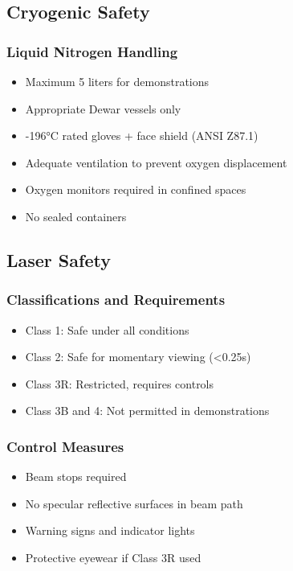 \subsection{Cryogenic Safety}

\subsubsection{Liquid Nitrogen Handling}
\begin{itemize}[noitemsep]
    \item Maximum 5 liters for demonstrations
    \item Appropriate Dewar vessels only
    \item -196°C rated gloves + face shield (ANSI Z87.1)
    \item Adequate ventilation to prevent oxygen displacement
    \item Oxygen monitors required in confined spaces
    \item No sealed containers
\end{itemize}

\subsection{Laser Safety}

\subsubsection{Classifications and Requirements}
\begin{itemize}[noitemsep]
    \item Class 1: Safe under all conditions
    \item Class 2: Safe for momentary viewing (<0.25s)
    \item Class 3R: Restricted, requires controls
    \item Class 3B and 4: Not permitted in demonstrations
\end{itemize}

\subsubsection{Control Measures}
\begin{itemize}[noitemsep]
    \item Beam stops required
    \item No specular reflective surfaces in beam path
    \item Warning signs and indicator lights
    \item Protective eyewear if Class 3R used
\end{itemize}

